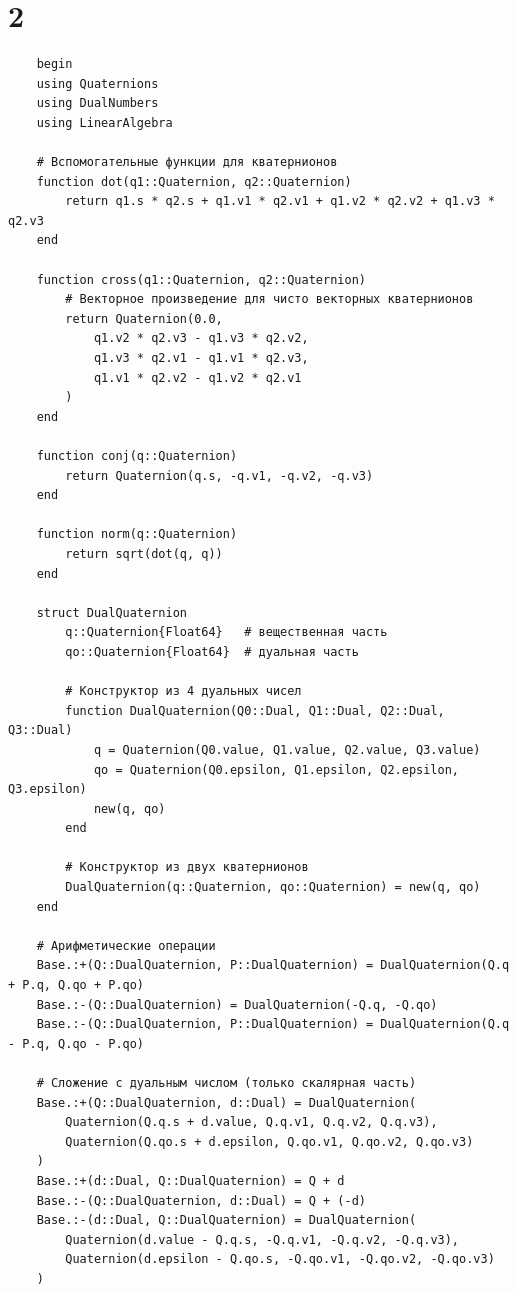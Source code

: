 \chapter{2}

\begin{verbatim}
    begin
    using Quaternions
    using DualNumbers
    using LinearAlgebra

    # Вспомогательные функции для кватернионов
    function dot(q1::Quaternion, q2::Quaternion)
        return q1.s * q2.s + q1.v1 * q2.v1 + q1.v2 * q2.v2 + q1.v3 * q2.v3
    end

    function cross(q1::Quaternion, q2::Quaternion)
        # Векторное произведение для чисто векторных кватернионов
        return Quaternion(0.0,
            q1.v2 * q2.v3 - q1.v3 * q2.v2,
            q1.v3 * q2.v1 - q1.v1 * q2.v3,
            q1.v1 * q2.v2 - q1.v2 * q2.v1
        )
    end

    function conj(q::Quaternion)
        return Quaternion(q.s, -q.v1, -q.v2, -q.v3)
    end

    function norm(q::Quaternion)
        return sqrt(dot(q, q))
    end

    struct DualQuaternion
        q::Quaternion{Float64}   # вещественная часть
        qo::Quaternion{Float64}  # дуальная часть

        # Конструктор из 4 дуальных чисел
        function DualQuaternion(Q0::Dual, Q1::Dual, Q2::Dual, Q3::Dual)
            q = Quaternion(Q0.value, Q1.value, Q2.value, Q3.value)
            qo = Quaternion(Q0.epsilon, Q1.epsilon, Q2.epsilon, Q3.epsilon)
            new(q, qo)
        end

        # Конструктор из двух кватернионов
        DualQuaternion(q::Quaternion, qo::Quaternion) = new(q, qo)
    end

    # Арифметические операции
    Base.:+(Q::DualQuaternion, P::DualQuaternion) = DualQuaternion(Q.q + P.q, Q.qo + P.qo)
    Base.:-(Q::DualQuaternion) = DualQuaternion(-Q.q, -Q.qo)
    Base.:-(Q::DualQuaternion, P::DualQuaternion) = DualQuaternion(Q.q - P.q, Q.qo - P.qo)

    # Сложение с дуальным числом (только скалярная часть)
    Base.:+(Q::DualQuaternion, d::Dual) = DualQuaternion(
        Quaternion(Q.q.s + d.value, Q.q.v1, Q.q.v2, Q.q.v3),
        Quaternion(Q.qo.s + d.epsilon, Q.qo.v1, Q.qo.v2, Q.qo.v3)
    )
    Base.:+(d::Dual, Q::DualQuaternion) = Q + d
    Base.:-(Q::DualQuaternion, d::Dual) = Q + (-d)
    Base.:-(d::Dual, Q::DualQuaternion) = DualQuaternion(
        Quaternion(d.value - Q.q.s, -Q.q.v1, -Q.q.v2, -Q.q.v3),
        Quaternion(d.epsilon - Q.qo.s, -Q.qo.v1, -Q.qo.v2, -Q.qo.v3)
    )


\end{verbatim}

